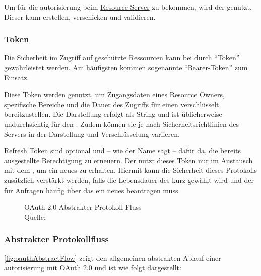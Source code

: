 		Um  für die \gls{autorisierung} beim \hyperref[par:resource-server]{Resource Server} zu bekommen,
		wird der \hyperref[par:authorization-server]{\authorizationServer} genutzt.
		Dieser kann  erstellen, verschicken und validieren.

	\subsubsection{Token}\label{subsubsec:token}
		Die Sicherheit im Zugriff auf geschützte Ressourcen
		kann bei  durch \enquote{Token} gewährleistet werden.
		Am häufigsten kommen sogenannte \enquote{Bearer-Token} zum Einsatz.

		Diese Token werden genutzt,
		um Zugangsdaten eines \hyperref[par:resource-owner]{Resource Owners},
		spezifische Bereiche und die Dauer des Zugriffs
		für einen \clienten{} verschlüsselt bereitzustellen.
		Die Darstellung erfolgt als String
		und ist üblicherweise undurchsichtig für den \clienten.
		Zudem können sie je nach Sicherheitsrichtlinien des Servers in der Darstellung und Verschlüsselung variieren.

		Refresh Token sind optional und -- wie der Name sagt -- dafür da,
		die bereits ausgestellte Berechtigung zu erneuern.
		Der \client{} nutzt dieses Token nur im Austausch
		mit dem \hyperref[par:authorization-server]{\authorizationServer},
		um ein neues \accessToken{} zu erhalten.
		Hiermit kann die Sicherheit dieses Protokolls zusätzlich verstärkt werden,
		falls die Lebensdauer des \accessTokens{} kurz gewählt wird und
		der \client{} für Anfragen häufig über das  ein neues \accessToken{} beantragen muss.

		\vspace{1em}

		\begin{figure}[h]
			\centering
			\pgfplotsset{width=.8\textwidth}
			
			\caption[OAuth 2.0 Abstrakter Protokoll Fluss]
			{OAuth 2.0 Abstrakter Protokoll Fluss\label{fig:oauthAbstractFlow}\\Quelle: }
		\end{figure}

	\subsubsection{Abstrakter Protokollfluss}\label{subsubsec:abstrakter-protokollfluss}
		\vref{fig:oauthAbstractFlow} zeigt den allgemeinen abstrakten Ablauf
		einer \gls{autorisierung} mit OAuth 2.0 und ist wie folgt dargestellt:

